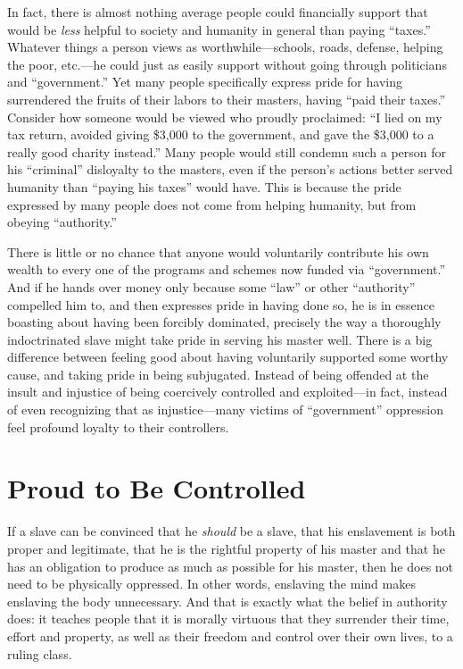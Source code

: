 \documentclass{book}
\begin{document}
In fact, there is almost nothing average people could financially support that would be \emph{less} helpful to society and humanity in general than paying \enquote{taxes.} Whatever things a person views as worthwhile---schools, roads, defense, helping the poor, etc.---he could just as easily support without going through politicians and \enquote{government.} Yet many people specifically express pride for having surrendered the fruits of their labors to their masters, having \enquote{paid their taxes.} Consider how someone would be viewed who proudly proclaimed: \enquote{I lied on my tax return, avoided giving \$3,000 to the government, and gave the \$3,000 to a really good charity instead.} Many people would still condemn such a person for his \enquote{criminal} disloyalty to the masters, even if the person's actions better served humanity than \enquote{paying his taxes} would have. This is because the pride expressed by many people does not come from helping humanity, but from obeying \enquote{authority.}

There is little or no chance that anyone would voluntarily contribute his own wealth to every one of the programs and schemes now funded via \enquote{government.} And if he hands over money only because some \enquote{law} or other \enquote{authority} compelled him to, and then expresses pride in having done so, he is in essence boasting about having been forcibly dominated, precisely the way a thoroughly indoctrinated slave might take pride in serving his master well. There is a big difference between feeling good about having voluntarily supported some worthy cause, and taking pride in being subjugated. Instead of being offended at the insult and injustice of being coercively controlled and exploited---in fact, instead of even recognizing that as injustice---many victims of \enquote{government} oppression feel profound loyalty to their controllers.

\section{Proud to Be Controlled}

If a slave can be convinced that he \emph{should} be a slave, that his enslavement is both proper and legitimate, that he is the rightful property of his master and that he has an obligation to produce as much as possible for his master, then he does not need to be physically oppressed. In other words, enslaving the mind makes enslaving the body unnecessary. And that is exactly what the belief in authority does: it teaches people that it is morally virtuous that they surrender their time, effort and property, as well as their freedom and control over their own lives, to a ruling class.
\end{document}

